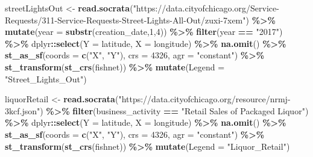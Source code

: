 \documentclass[
]{article}
\newenvironment{Shaded}{\begin{snugshade}}{\end{snugshade}}
\newcommand{\AttributeTok}[1]{\textcolor[rgb]{0.13,0.29,0.53}{#1}}
\newcommand{\DecValTok}[1]{\textcolor[rgb]{0.00,0.00,0.81}{#1}}
\newcommand{\FunctionTok}[1]{\textcolor[rgb]{0.13,0.29,0.53}{\textbf{#1}}}
\newcommand{\NormalTok}[1]{#1}
\newcommand{\OtherTok}[1]{\textcolor[rgb]{0.56,0.35,0.01}{#1}}
\newcommand{\SpecialCharTok}[1]{\textcolor[rgb]{0.81,0.36,0.00}{\textbf{#1}}}
\newcommand{\StringTok}[1]{\textcolor[rgb]{0.31,0.60,0.02}{#1}}
\begin{document}
\begin{Shaded}
\begin{Highlighting}[]
\NormalTok{streetLightsOut }\OtherTok{\textless{}{-}} 
  \FunctionTok{read.socrata}\NormalTok{(}\StringTok{"https://data.cityofchicago.org/Service{-}Requests/311{-}Service{-}Requests{-}Street{-}Lights{-}All{-}Out/zuxi{-}7xem"}\NormalTok{) }\SpecialCharTok{\%\textgreater{}\%}
    \FunctionTok{mutate}\NormalTok{(}\AttributeTok{year =} \FunctionTok{substr}\NormalTok{(creation\_date,}\DecValTok{1}\NormalTok{,}\DecValTok{4}\NormalTok{)) }\SpecialCharTok{\%\textgreater{}\%} \FunctionTok{filter}\NormalTok{(year }\SpecialCharTok{==} \StringTok{"2017"}\NormalTok{) }\SpecialCharTok{\%\textgreater{}\%}
\NormalTok{    dplyr}\SpecialCharTok{::}\FunctionTok{select}\NormalTok{(}\AttributeTok{Y =}\NormalTok{ latitude, }\AttributeTok{X =}\NormalTok{ longitude) }\SpecialCharTok{\%\textgreater{}\%}
    \FunctionTok{na.omit}\NormalTok{() }\SpecialCharTok{\%\textgreater{}\%}
    \FunctionTok{st\_as\_sf}\NormalTok{(}\AttributeTok{coords =} \FunctionTok{c}\NormalTok{(}\StringTok{"X"}\NormalTok{, }\StringTok{"Y"}\NormalTok{), }\AttributeTok{crs =} \DecValTok{4326}\NormalTok{, }\AttributeTok{agr =} \StringTok{"constant"}\NormalTok{) }\SpecialCharTok{\%\textgreater{}\%}
    \FunctionTok{st\_transform}\NormalTok{(}\FunctionTok{st\_crs}\NormalTok{(fishnet)) }\SpecialCharTok{\%\textgreater{}\%}
    \FunctionTok{mutate}\NormalTok{(}\AttributeTok{Legend =} \StringTok{"Street\_Lights\_Out"}\NormalTok{)}

\NormalTok{liquorRetail }\OtherTok{\textless{}{-}} 
  \FunctionTok{read.socrata}\NormalTok{(}\StringTok{"https://data.cityofchicago.org/resource/nrmj{-}3kcf.json"}\NormalTok{) }\SpecialCharTok{\%\textgreater{}\%}  
    \FunctionTok{filter}\NormalTok{(business\_activity }\SpecialCharTok{==} \StringTok{"Retail Sales of Packaged Liquor"}\NormalTok{) }\SpecialCharTok{\%\textgreater{}\%}
\NormalTok{    dplyr}\SpecialCharTok{::}\FunctionTok{select}\NormalTok{(}\AttributeTok{Y =}\NormalTok{ latitude, }\AttributeTok{X =}\NormalTok{ longitude) }\SpecialCharTok{\%\textgreater{}\%}
    \FunctionTok{na.omit}\NormalTok{() }\SpecialCharTok{\%\textgreater{}\%}
    \FunctionTok{st\_as\_sf}\NormalTok{(}\AttributeTok{coords =} \FunctionTok{c}\NormalTok{(}\StringTok{"X"}\NormalTok{, }\StringTok{"Y"}\NormalTok{), }\AttributeTok{crs =} \DecValTok{4326}\NormalTok{, }\AttributeTok{agr =} \StringTok{"constant"}\NormalTok{) }\SpecialCharTok{\%\textgreater{}\%}
    \FunctionTok{st\_transform}\NormalTok{(}\FunctionTok{st\_crs}\NormalTok{(fishnet)) }\SpecialCharTok{\%\textgreater{}\%}
    \FunctionTok{mutate}\NormalTok{(}\AttributeTok{Legend =} \StringTok{"Liquor\_Retail"}\NormalTok{)}


\end{Highlighting}
\end{Shaded}
\end{document}

